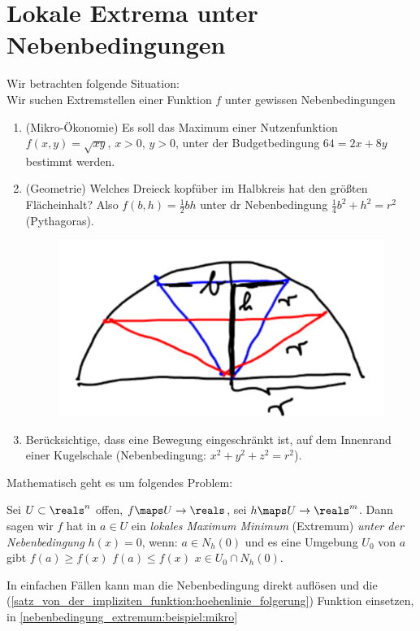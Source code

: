 \section*{Lokale Extrema unter Nebenbedingungen}
Wir betrachten folgende Situation:\\
Wir suchen Extremstellen einer Funktion \( f \) unter gewissen Nebenbedingungen \zb 
\begin{enumerate}[label=\rechtsklammer{\alph*}]
  \item\label{nebenbedingung_extremum:beispiel:mikro} (Mikro-Ökonomie) Es soll das Maximum einer Nutzenfunktion \( f(x,y)=\sqrt{xy} \), \( x>0 \), \( y>0 \), unter der Budgetbedingung \( 64=2x+8y \) bestimmt werden.
  \item\label{nebenbedingung_extremum:beispiel:geometrie} (Geometrie) Welches Dreieck kopfüber im Halbkreis hat den größten Flächeinhalt? Also \( f(b,h)=\frac{1}{2}bh \) unter dr Nebenbedingung \( \frac{1}{4}b^2+h^2=r^2 \) (Pythagoras).
  \begin{figure}[H]
    \centering
    \includegraphics[width=0.4\linewidth]{figures/dreiecksmaximierung}
    \label{fig:dreiecksmaximierung}
  \end{figure}
  \item Berücksichtige, dass eine Bewegung eingeschränkt ist, \zb auf dem Innenrand einer Kugelschale (Nebenbedingung: \( x^2+y^2+z^2=r^2 \)).
\end{enumerate}
Mathematisch geht es um folgendes Problem:
\begin{definition}\label{nebenbedingung_extremum}
  Sei \( U\subset \reals^n \) offen, \( f\maps U\to \reals \), sei \( h\maps U\to \reals^m \). Dann sagen wir \( f \) hat in \( a\in U \) ein \emph{lokales Maximum \bzw Minimum} (Extremum) \emph{unter der Nebenbedingung} \( h(x)=0 \), wenn: \( a\in N_h(0) \) und es eine Umgebung \( U_0 \) von \( a \) gibt \sd \( f(a)\geq f(x) \) \bzw \( f(a)\leq f(x) \) \tforall \( x\in U_0 \cap N_h(0) \).
\end{definition}
In einfachen Fällen kann man die Nebenbedingung direkt auflösen und die (\ref{satz_von_der_impliziten_funktion:hoehenlinie_folgerung}) Funktion einsetzen, \zb in \ref{nebenbedingung_extremum:beispiel:mikro}
